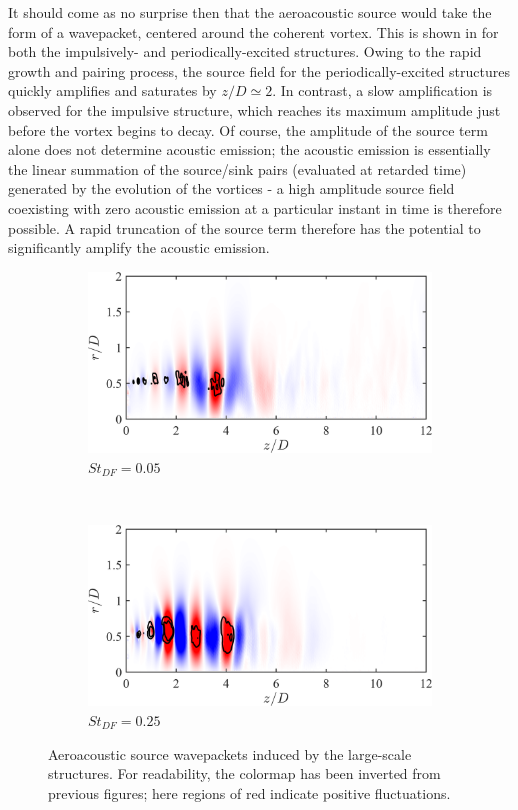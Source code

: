 It should come as no surprise then that the aeroacoustic source would take the form of a wavepacket, centered around the coherent vortex.
This is shown in  for both the impulsively- and periodically-excited structures.
Owing to the rapid growth and pairing process, the source field for the periodically-excited structures quickly amplifies and saturates by $z/D \simeq 2$.
In contrast, a slow amplification is observed for the impulsive structure, which reaches its maximum amplitude just before the vortex begins to decay. 
Of course, the amplitude of the source term alone does not determine acoustic emission; the acoustic emission is essentially the linear summation of the source/sink pairs (evaluated at retarded time) generated by the evolution of the vortices - a high amplitude source field coexisting with zero acoustic emission at a particular instant in time is therefore possible.
A rapid truncation of the source term therefore has the potential to significantly amplify the acoustic emission.
\begin{figure}
	\centering
	\begin{subfigure}{0.75\textwidth}
		\centering
		\includegraphics[width=0.95\linewidth]{Figures/ch5_St005_SL_131.png}
		\caption{$St_{DF} = 0.05$}
	\end{subfigure}\\
	\begin{subfigure}{0.75\textwidth}
		\centering
		\includegraphics[width=0.95\linewidth]{Figures/ch5_St025_SL_1.png}
		\caption{$St_{DF} = 0.25$}
	\end{subfigure}
	\caption{Aeroacoustic source wavepackets induced by the large-scale structures. For readability, the colormap has been inverted from previous figures; here regions of red indicate positive fluctuations.}
	\label{fig:SL}
\end{figure}

